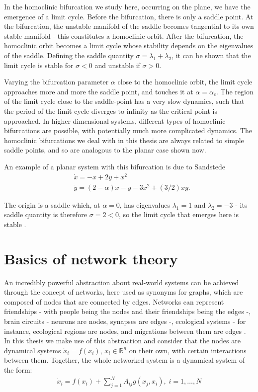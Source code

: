 In the homoclinic bifurcation we study here, occurring on the plane, we have the emergence of a limit cycle. Before the bifurcation, there is only a saddle point. At the bifurcation, the unstable manifold of the saddle becomes tangential to its own stable manifold - this constitutes a homoclinic orbit. After the bifurcation, the homoclinic orbit becomes a limit cycle whose stability depends on the eigenvalues of the saddle. Defining the saddle quantity $\sigma = \lambda_1 + \lambda_2$, it can be shown \cite{kuznetsov} that the limit cycle is stable for $\sigma < 0$ and unstable if $\sigma > 0$. 

Varying the bifurcation parameter $\alpha$ close to the homoclinic orbit, the limit cycle approaches more and more the saddle point, and touches it at $\alpha = \alpha_c$. The region of the limit cycle close to the saddle-point has a very slow dynamics, such that the period of the limit cycle diverges to infinity as the critical point is approached. In higher dimensional systems, different types of homoclinic bifurcations are possible, with potentially much more complicated dynamics. The homoclinic bifurcations we deal with in this thesis are always related to simple saddle points, and so are analogous to the planar case shown now. 

An example of a planar system with this bifurcation is due to Sandstede \cite{sandstede1997constructing}
%
\begin{align}
    &\dot{x} = -x + 2y + x^2  \\ 
    &\dot{y} = (2-\alpha)x - y - 3x^2 + (3/2)xy.
    \label{eq:sandstede}
\end{align}

The origin is a saddle which, at $\alpha=0$, has eigenvalues $\lambda_1 =1$ and $\lambda_2 = -3$ - its saddle quantity is therefore $\sigma = 2 < 0$, so the limit cycle that emerges here is stable \cite{kuznetsov}.


\section{Basics of network theory}\label{method:sec:network}
An incredibly powerful abstraction about real-world systems can be achieved through the concept of networks, here used as synonyms for graphs, which are composed of nodes that are connected by edges. Networks can represent friendships - with people being the nodes and their friendships being the edges -, brain circuits - neurons are nodes, synapses are edges \cite{bullmore2009complex} -, ecological systems - for instance, ecological regions are nodes, and migrations between them are edges \cite{landi2018complexity}. In this thesis we make use of this abstraction and consider that the nodes are dynamical systems $\dot{x}_i = f(x_i)$, $x_i \in \mathbb{R}^n$ on their own, with certain interactions between them. Together, the whole networked system is a dynamical system of the form:
%
\begin{align}
    \dot{x}_i = f(x_i) + \sum_{j=1}^N A_{ij} g(x_j, x_i),\; i=1,\ldots,N
    \label{eq:network-general}
\end{align} 

